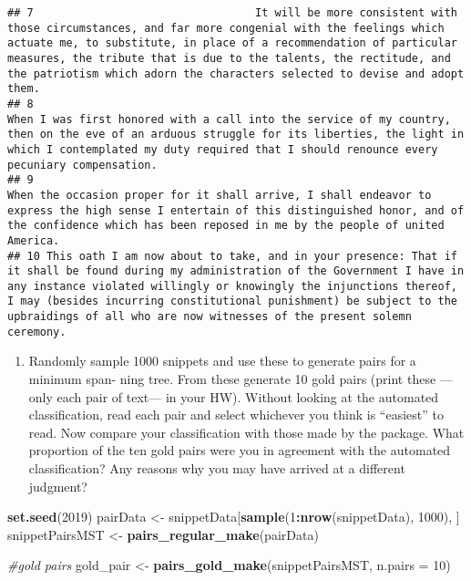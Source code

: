 \documentclass[]{article}
\newenvironment{Shaded}{\begin{snugshade}}{\end{snugshade}}
\newcommand{\KeywordTok}[1]{\textcolor[rgb]{0.13,0.29,0.53}{\textbf{#1}}}
\newcommand{\DataTypeTok}[1]{\textcolor[rgb]{0.13,0.29,0.53}{#1}}
\newcommand{\DecValTok}[1]{\textcolor[rgb]{0.00,0.00,0.81}{#1}}
\newcommand{\StringTok}[1]{\textcolor[rgb]{0.31,0.60,0.02}{#1}}
\newcommand{\CommentTok}[1]{\textcolor[rgb]{0.56,0.35,0.01}{\textit{#1}}}
\newcommand{\OperatorTok}[1]{\textcolor[rgb]{0.81,0.36,0.00}{\textbf{#1}}}
\newcommand{\NormalTok}[1]{#1}
\providecommand{\tightlist}{%
  \setlength{\itemsep}{0pt}\setlength{\parskip}{0pt}}
\begin{document}
\begin{verbatim}
## 7                                  It will be more consistent with those circumstances, and far more congenial with the feelings which actuate me, to substitute, in place of a recommendation of particular measures, the tribute that is due to the talents, the rectitude, and the patriotism which adorn the characters selected to devise and adopt them.
## 8                                                                                                                       When I was first honored with a call into the service of my country, then on the eve of an arduous struggle for its liberties, the light in which I contemplated my duty required that I should renounce every pecuniary compensation.
## 9                                                                                                                                        When the occasion proper for it shall arrive, I shall endeavor to express the high sense I entertain of this distinguished honor, and of the confidence which has been reposed in me by the people of united America.
## 10 This oath I am now about to take, and in your presence: That if it shall be found during my administration of the Government I have in any instance violated willingly or knowingly the injunctions thereof, I may (besides incurring constitutional punishment) be subject to the upbraidings of all who are now witnesses of the present solemn ceremony.
\end{verbatim}

\begin{enumerate}
\def\labelenumi{(\alph{enumi})}
\setcounter{enumi}{1}
\tightlist
\item
  Randomly sample 1000 snippets and use these to generate pairs for a
  minimum span- ning tree. From these generate 10 gold pairs (print
  these ---only each pair of text--- in your HW). Without looking at the
  automated classification, read each pair and select whichever you
  think is ``easiest'' to read. Now compare your classification with
  those made by the package. What proportion of the ten gold pairs were
  you in agreement with the automated classification? Any reasons why
  you may have arrived at a different judgment?
\end{enumerate}

\begin{Shaded}
\begin{Highlighting}[]
\KeywordTok{set.seed}\NormalTok{(}\DecValTok{2019}\NormalTok{)}
\NormalTok{pairData <-}\StringTok{ }\NormalTok{snippetData[}\KeywordTok{sample}\NormalTok{(}\DecValTok{1}\OperatorTok{:}\KeywordTok{nrow}\NormalTok{(snippetData), }\DecValTok{1000}\NormalTok{), ]}
\NormalTok{snippetPairsMST <-}\StringTok{ }\KeywordTok{pairs_regular_make}\NormalTok{(pairData)}

\CommentTok{#gold pairs}
\NormalTok{gold_pair <-}\StringTok{ }\KeywordTok{pairs_gold_make}\NormalTok{(snippetPairsMST, }\DataTypeTok{n.pairs =} \DecValTok{10}\NormalTok{)}
\end{Highlighting}
\end{Shaded}
\end{document}
